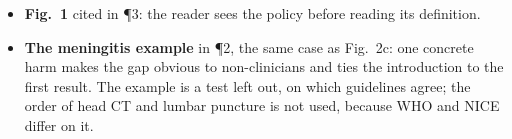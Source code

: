 \artefacts
\begin{itemize}
\item \textbf{Fig.~1} cited in \P3: the reader sees the policy before reading its definition.
\item \textbf{The meningitis example} in \P2, the same case as Fig.~2c: one concrete harm makes the gap
obvious to non-clinicians and ties the introduction to the first result. The example is a test left
out, on which guidelines agree; the order of head CT and lumbar puncture is not used, because WHO and
NICE differ on it.
\end{itemize}

